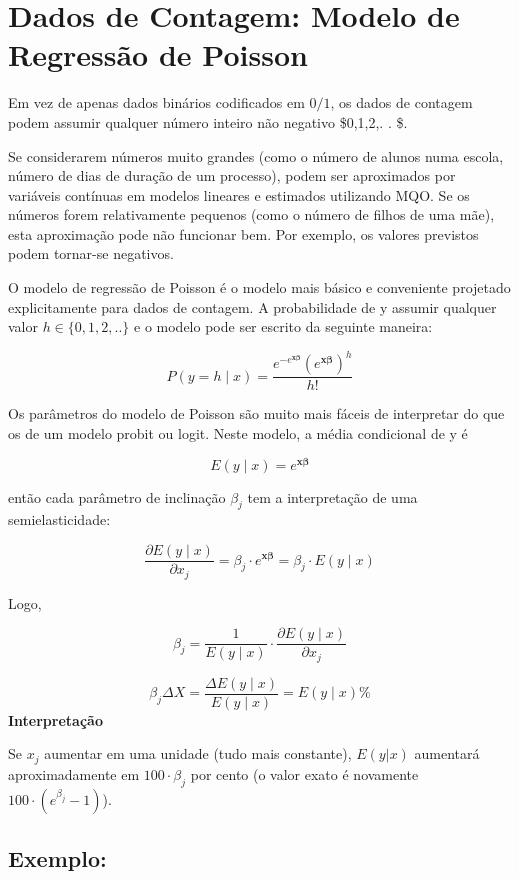 \documentclass[
  letterpaper,
  DIV=11,
  numbers=noendperiod]{scrreprt}
\begin{document}
\section{Dados de Contagem: Modelo de Regressão de
Poisson}\label{dados-de-contagem-modelo-de-regressuxe3o-de-poisson}

Em vez de apenas dados binários codificados em \(0/1\), os dados de
contagem podem assumir qualquer número inteiro não negativo \$0,1,2,. .
\$.

Se considerarem números muito grandes (como o número de alunos numa
escola, número de dias de duração de um processo), podem ser aproximados
por variáveis contínuas em modelos lineares e estimados utilizando MQO.
Se os números forem relativamente pequenos (como o número de filhos de
uma mãe), esta aproximação pode não funcionar bem. Por exemplo, os
valores previstos podem tornar-se negativos.

O modelo de regressão de Poisson é o modelo mais básico e conveniente
projetado explicitamente para dados de contagem. A probabilidade de y
assumir qualquer valor \(h \in \{0,1,2,..\}\) e o modelo pode ser
escrito da seguinte maneira:

\[P(y = h \mid x) = \frac{e^{-e^{\mathbf{x} \boldsymbol{\beta}}} (e^{\mathbf{x} \boldsymbol{\beta}})^h}{h!}\]

Os parâmetros do modelo de Poisson são muito mais fáceis de interpretar
do que os de um modelo probit ou logit. Neste modelo, a média
condicional de y é

\[E(y \mid x) = e^{\mathbf{x} \boldsymbol{\beta}}\]

então cada parâmetro de inclinação \(\beta_j\) tem a interpretação de
uma semielasticidade:

\[\frac{\partial E(y \mid x)}{\partial x_j} = \beta_j \cdot e^{\mathbf{x} \boldsymbol{\beta}} = \beta_j \cdot E(y \mid x)\]

Logo,

\[\beta_j = \frac{1}{E(y \mid x)} \cdot \frac{\partial E(y \mid x)}{\partial x_j}\]

\[\beta_j \Delta{X}= \frac{\Delta E(y \mid x)}{E(y \mid x)}=E(y \mid x)\%\]
\textbf{Interpretação}

Se \(x_j\) aumentar em uma unidade (tudo mais constante), \(E(y|x)\)
aumentará aproximadamente em \(100 \cdot \beta_j\) por cento (o valor
exato é novamente \(100 \cdot (e^{\beta_j} - 1)\)).

\subsection{Exemplo:}\label{exemplo}
\end{document}
